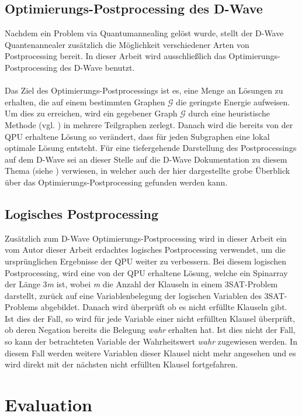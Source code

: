 \documentclass[runningheads]{llncs}
\begin{document}
\subsection{Optimierungs-Postprocessing des D-Wave}
Nachdem ein Problem via Quantumannealing gelöst wurde, stellt der D-Wave Quantenannealer zusätzlich die Möglichkeit verschiedener Arten von Postprocessing bereit. In dieser Arbeit wird ausschließlich das Optimierungs-Postprocessing des D-Wave benutzt.\\\\Das Ziel des Optimierungs-Postprocessings ist es, eine Menge an Lösungen zu erhalten, die auf einem bestimmten Graphen $\mathcal{G}$ die geringste Energie aufweisen. Um dies zu erreichen, wird ein gegebener Graph $\mathcal{G}$ durch eine heuristische Methode (vgl. \cite{markowitz1957elimination}) in mehrere Teilgraphen zerlegt. Danach wird die bereits von der QPU erhaltene Lösung so verändert, dass für jeden Subgraphen eine lokal optimale Lösung entsteht. Für eine tiefergehende Darstellung des Postprocessings auf dem D-Wave sei an dieser Stelle auf die D-Wave Dokumentation zu diesem Thema (siehe \cite{dwavepostprocessing}) verwiesen, in welcher auch der hier dargestellte grobe Überblick über das Optimierungs-Postprocessing gefunden werden kann.
\subsection{Logisches Postprocessing}
Zusätzlich zum D-Wave Optimierungs-Postprocessing wird in dieser Arbeit ein vom Autor dieser Arbeit erdachtes logisches Postprocessing verwendet, um die ursprünglichen Ergebnisse der QPU weiter zu verbessern. Bei diesem logischen Postprocessing, wird eine von der QPU erhaltene Lösung, welche ein Spinarray der Länge 3\emph{m} ist, wobei \emph{m} die Anzahl der Klauseln in einem 3SAT-Problem darstellt, zurück auf eine Variablenbelegung der logischen Variablen des 3SAT-Problems abgebildet. Danach wird überprüft ob es nicht erfüllte Klauseln gibt. Ist dies der Fall, so wird für jede Variable einer nicht erfüllten Klausel überprüft, ob deren Negation bereits die Belegung \emph{wahr} erhalten hat. Ist dies nicht der Fall, so kann der betrachteten Variable der Wahrheitswert \emph{wahr} zugewiesen werden. In diesem Fall werden weitere Variablen dieser Klausel nicht mehr angesehen und es wird direkt mit der nächsten nicht erfüllten Klausel fortgefahren.


\section{Evaluation}
\end{document}
